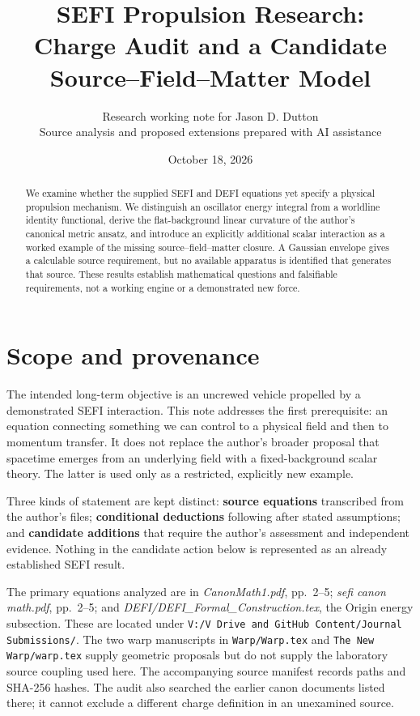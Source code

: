 \documentclass[11pt]{article}
\title{SEFI Propulsion Research:\\Charge Audit and a Candidate Source--Field--Matter Model}
\author{Research working note for Jason D. Dutton\\\small Source analysis and proposed extensions prepared with AI assistance}
\date{October 18, 2026}
\begin{document}
\maketitle
\begin{abstract}
We examine whether the supplied SEFI and DEFI equations yet specify a physical propulsion mechanism. We distinguish an oscillator energy integral from a worldline identity functional, derive the flat-background linear curvature of the author's canonical metric ansatz, and introduce an explicitly additional scalar interaction as a worked example of the missing source--field--matter closure. A Gaussian envelope gives a calculable source requirement, but no available apparatus is identified that generates that source. These results establish mathematical questions and falsifiable requirements, not a working engine or a demonstrated new force.
\end{abstract}
\section{Scope and provenance}
The intended long-term objective is an uncrewed vehicle propelled by a demonstrated SEFI interaction. This note addresses the first prerequisite: an equation connecting something we can control to a physical field and then to momentum transfer. It does not replace the author's broader proposal that spacetime emerges from an underlying field with a fixed-background scalar theory. The latter is used only as a restricted, explicitly new example.

Three kinds of statement are kept distinct: \textbf{source equations} transcribed from the author's files; \textbf{conditional deductions} following after stated assumptions; and \textbf{candidate additions} that require the author's assessment and independent evidence. Nothing in the candidate action below is represented as an already established SEFI result.

The primary equations analyzed are in \emph{CanonMath1.pdf}, pp.~2--5; \emph{sefi canon math.pdf}, pp.~2--5; and \emph{DEFI/DEFI\_Formal\_Construction.tex}, the Origin energy subsection. These are located under \texttt{V:/V Drive and GitHub Content/Journal Submissions/}. The two warp manuscripts in \texttt{Warp/Warp.tex} and \texttt{The New Warp/warp.tex} supply geometric proposals but do not supply the laboratory source coupling used here. The accompanying source manifest records paths and SHA-256 hashes. The audit also searched the earlier canon documents listed there; it cannot exclude a different charge definition in an unexamined source.
\end{document}
